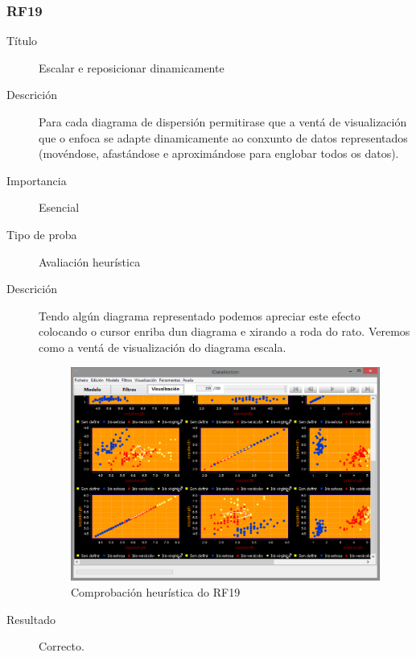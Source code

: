 \subsubsection*{RF19}
\begin{description}
\item[Título] \hfill
Escalar e reposicionar dinamicamente
\item[Descrición] \hfill
Para cada diagrama de dispersión permitirase que a ventá de visualización que o enfoca se adapte dinamicamente ao conxunto de datos representados (movéndose, afastándose e aproximándose para englobar todos os datos).
\item[Importancia] \hfill
Esencial
\item[Tipo de proba] \hfill
Avaliación heurística
\item[Descrición]
Tendo algún diagrama representado podemos apreciar este efecto colocando o cursor enriba dun diagrama e xirando a roda do rato. Veremos como a ventá de visualización do diagrama escala.
\begin{figure}
\centering
\includegraphics[width=\textwidth,height=\textheight,keepaspectratio]{figuras/RF19}
\caption{Comprobación heurística do RF19}
\label{RF19}
\end{figure}
\item[Resultado]
Correcto.
\end{description}

